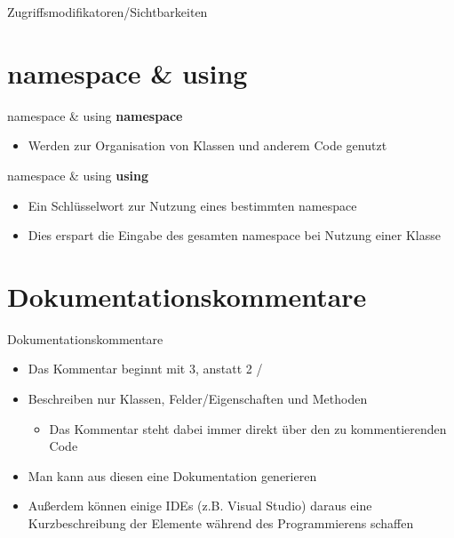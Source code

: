 \begin{frame}{Zugriffsmodifikatoren/Sichtbarkeiten}
	
\end{frame}

\section{namespace \& using}
\begin{frame}{namespace \& using}
	\textbf{namespace}\\
	\begin{itemize}
		\item Werden zur Organisation von Klassen und anderem Code genutzt
	\end{itemize}	
	
\end{frame}

\begin{frame}{namespace \& using}
	\textbf{using}\\
	\begin{itemize}
		\item Ein Schlüsselwort zur Nutzung eines bestimmten namespace
		\item Dies erspart die Eingabe des gesamten namespace bei Nutzung einer Klasse
	\end{itemize}
	
\end{frame}

\section{Dokumentationskommentare}
\begin{frame}{Dokumentationskommentare}
	\begin{itemize}
		\item Das Kommentar beginnt mit 3, anstatt 2 \alert{/}
		\item Beschreiben nur Klassen, Felder/Eigenschaften und Methoden
		\begin{itemize}
			\item Das Kommentar steht dabei immer direkt über den zu kommentierenden Code
		\end{itemize}
		\item Man kann aus diesen eine Dokumentation generieren
		\item Außerdem können einige IDEs (z.B. Visual Studio) daraus eine Kurzbeschreibung der Elemente während des Programmierens schaffen		
	\end{itemize}
\end{frame}

